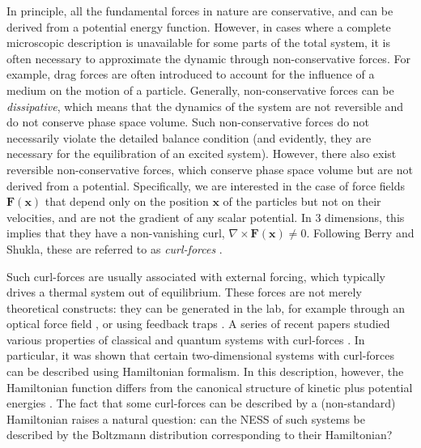 In principle, all the fundamental forces in nature are conservative, and can be derived from a potential energy function. However, in cases where a complete microscopic description is unavailable for some parts of the total system, it  is often necessary to approximate the dynamic through non-conservative forces. For example, drag forces are often introduced to account for the influence of a medium on the motion of a particle. Generally, non-conservative forces can be \emph{dissipative}, which means that the dynamics of the system are not reversible and do not conserve phase space volume. Such non-conservative forces do not necessarily violate the detailed balance condition (and evidently, they are necessary for the equilibration of an excited system). However, there also exist reversible non-conservative forces, which conserve phase space volume but are not derived from a potential. Specifically, we are interested in the case of force fields $\mathbf{F}(\mathbf{x})$ that depend only on the position $\mathbf{x}$ of the particles but not on their velocities, and are not the gradient of any scalar potential. In 3 dimensions, this implies that they have a non-vanishing curl, $\nabla \times \mathbf{F}(\mathbf{x})\neq0$. Following Berry and Shukla, these are referred to as \emph{curl-forces} \cite{berry2012classical}. 

Such curl-forces are usually associated with external forcing, which typically drives a thermal system out of equilibrium. These forces are not merely theoretical constructs: they can be generated in the lab, for example through an optical force field \cite{curtis2003structure, roichman2008influence,roichman2008optical, sun2009brownian, wu2009direct, liberal2013near, sukhov2017non, volpe2023roadmap}, or using feedback traps \cite{jun2012virtual}. 
A series of recent papers studied various properties of classical and quantum systems with curl-forces 
\cite{berry2012classical, berry2015hamiltonian, berry2016curl, berry2023quantum, berry2024quantising, berry2025six}. 
In particular, it was shown that certain two-dimensional systems with curl-forces can be described using Hamiltonian formalism. In this description, however, the Hamiltonian function differs from the canonical structure of kinetic plus potential energies \cite{berry2015hamiltonian}. The fact that some curl-forces can be described by a (non-standard) Hamiltonian raises a natural question: can the NESS of such systems be described by the Boltzmann distribution corresponding to their Hamiltonian? 

